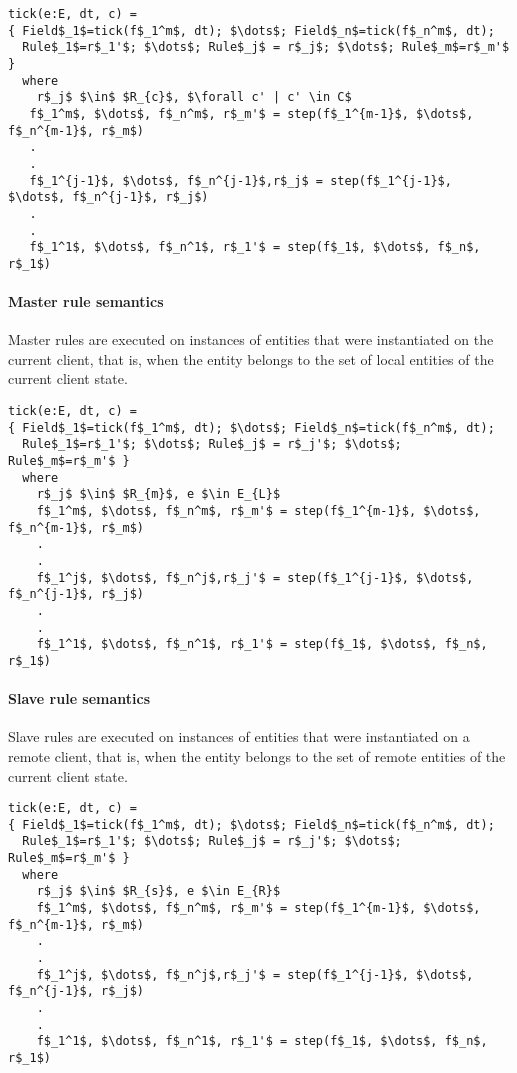 \begin{lstlisting}[mathescape]
tick(e:E, dt, c) =
{ Field$_1$=tick(f$_1^m$, dt); $\dots$; Field$_n$=tick(f$_n^m$, dt);
  Rule$_1$=r$_1'$; $\dots$; Rule$_j$ = r$_j$; $\dots$; Rule$_m$=r$_m'$ }
  where
    r$_j$ $\in$ $R_{c}$, $\forall c' | c' \in C$
   f$_1^m$, $\dots$, f$_n^m$, r$_m'$ = step(f$_1^{m-1}$, $\dots$, f$_n^{m-1}$, r$_m$)
   .
   .
   f$_1^{j-1}$, $\dots$, f$_n^{j-1}$,r$_j$ = step(f$_1^{j-1}$, $\dots$, f$_n^{j-1}$, r$_j$)
   .
   .
   f$_1^1$, $\dots$, f$_n^1$, r$_1'$ = step(f$_1$, $\dots$, f$_n$, r$_1$)
\end{lstlisting}

\paragraph{Master rule semantics}
Master rules are executed on instances of entities that were instantiated on the current client, that is, when the entity belongs to the set of local entities of the current client state.

\begin{lstlisting}[mathescape]
tick(e:E, dt, c) =
{ Field$_1$=tick(f$_1^m$, dt); $\dots$; Field$_n$=tick(f$_n^m$, dt);
  Rule$_1$=r$_1'$; $\dots$; Rule$_j$ = r$_j'$; $\dots$; Rule$_m$=r$_m'$ }
  where
    r$_j$ $\in$ $R_{m}$, e $\in E_{L}$
    f$_1^m$, $\dots$, f$_n^m$, r$_m'$ = step(f$_1^{m-1}$, $\dots$, f$_n^{m-1}$, r$_m$)
    .
    .
    f$_1^j$, $\dots$, f$_n^j$,r$_j'$ = step(f$_1^{j-1}$, $\dots$, f$_n^{j-1}$, r$_j$)
    .
    .
    f$_1^1$, $\dots$, f$_n^1$, r$_1'$ = step(f$_1$, $\dots$, f$_n$, r$_1$)
\end{lstlisting}

\paragraph{Slave rule semantics}
Slave rules are executed on instances of entities that were instantiated on a remote client, that is, when the entity belongs to the set of remote entities of the current client state.

\begin{lstlisting}[mathescape]
tick(e:E, dt, c) =
{ Field$_1$=tick(f$_1^m$, dt); $\dots$; Field$_n$=tick(f$_n^m$, dt);
  Rule$_1$=r$_1'$; $\dots$; Rule$_j$ = r$_j'$; $\dots$; Rule$_m$=r$_m'$ }
  where
    r$_j$ $\in$ $R_{s}$, e $\in E_{R}$
    f$_1^m$, $\dots$, f$_n^m$, r$_m'$ = step(f$_1^{m-1}$, $\dots$, f$_n^{m-1}$, r$_m$)
    .
    .
    f$_1^j$, $\dots$, f$_n^j$,r$_j'$ = step(f$_1^{j-1}$, $\dots$, f$_n^{j-1}$, r$_j$)
    .
    .
    f$_1^1$, $\dots$, f$_n^1$, r$_1'$ = step(f$_1$, $\dots$, f$_n$, r$_1$)
\end{lstlisting}

